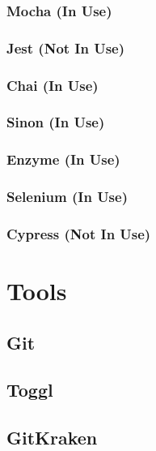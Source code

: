 \documentclass[12pt]{article}
\begin{document}
\subsubsection{Mocha (In Use)}

\subsubsection{Jest (Not In Use)}

\subsubsection{Chai (In Use)}

\subsubsection{Sinon (In Use)}

\subsubsection{Enzyme (In Use)}

\subsubsection{Selenium (In Use)}

\subsubsection{Cypress (Not In Use)}



\newpage

\section{Tools}

\subsection{Git}

\subsection{Toggl}

\subsection{GitKraken}
\end{document}
